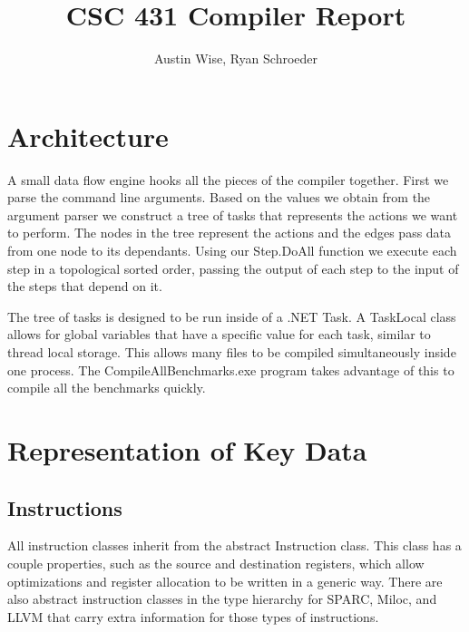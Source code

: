 \documentclass[12pt]{article}
\title{CSC 431 Compiler Report}
\date{}
\author{Austin Wise, Ryan Schroeder}
\begin{document}
\maketitle
\tableofcontents

\pagebreak

\section{Architecture}

A small data flow engine hooks all the pieces of the compiler together.
First we parse the command line arguments.
Based on the values we obtain from the argument parser we construct a tree of tasks that represents the actions we want to perform.
The nodes in the tree represent the actions and the edges pass data from one node to its dependants.
Using our Step.DoAll function we execute each step in a topological sorted order, passing the output of each step to the input of the steps that depend on it.


The tree of tasks is designed to be run inside of a .NET Task.
A TaskLocal class allows for global variables that have a specific value for each task, similar to thread local storage.
This allows many files to be compiled simultaneously inside one process.
The CompileAllBenchmarks.exe program takes advantage of this to compile all the benchmarks quickly.


	

\section{Representation of Key Data}


\subsection{Instructions}
All instruction classes inherit from the abstract Instruction class.
This class has a couple properties, such as the source and destination registers, which allow optimizations and register allocation to be written in a generic way.
There are also abstract instruction classes in the type hierarchy for SPARC, Miloc, and LLVM that carry extra information for those types of instructions.
\end{document}
